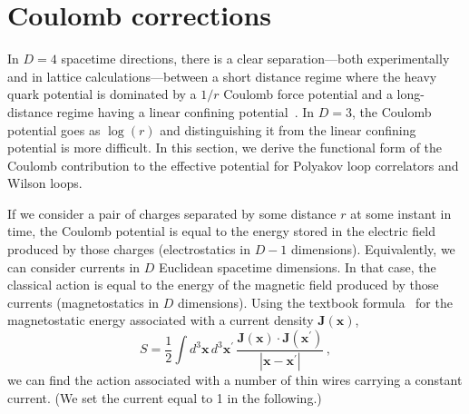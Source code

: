 \documentclass[preprint,aps,prd]{revtex4-2}
\newcommand{\be}{\begin{equation}}
\newcommand{\eq}{\end{equation}}
\DeclareMathOperator{\SU}{SU}
\DeclareMathOperator{\Tr}{Tr}
\begin{document}


\section{Coulomb corrections}
\label{coulomb}

In $D=4$ spacetime directions, there is a clear separation---both
experimentally and in lattice calculations---between a
short distance regime where the heavy quark potential is
dominated by a $1/r$ Coulomb force potential and a
long-distance regime having a linear confining
potential~\cite{bali_static_2000,brambilla_effective-field_2005}.
In $D=3$, the Coulomb potential goes as $\log(r)$ and distinguishing
it from the linear confining potential is more difficult.
In this section, we derive
the functional form of the Coulomb contribution to
the effective potential for Polyakov loop correlators and Wilson
loops.

If we consider a pair of charges separated by some
distance $r$ at some instant in time, the Coulomb potential is
equal to the energy stored in the electric
field produced by those charges (electrostatics in $D-1$
dimensions).  Equivalently, we can consider currents
in $D$ Euclidean spacetime dimensions.  In that case,
the classical action is equal to the
energy of the magnetic field produced by those currents
(magnetostatics in $D$ dimensions).  Using the textbook
formula~\cite{jackson_classical_1975}
for the magnetostatic energy associated with a current density
$\mathbf{J}(\mathbf{x})$,
%
\be
S = \frac{1}{2} \int d^3\mathbf{x}\, d^3\mathbf{x}^\prime\,
\frac{\mathbf{J}(\mathbf{x}) \cdot
  \mathbf{J}(\mathbf{x}^\prime)}{
  \left| \mathbf{x}-\mathbf{x}^\prime\right|} \, ,
\eq
%
we can find the action associated with a number of thin wires
carrying a constant current. (We set the current equal to 1 in
the following.)
\end{document}
